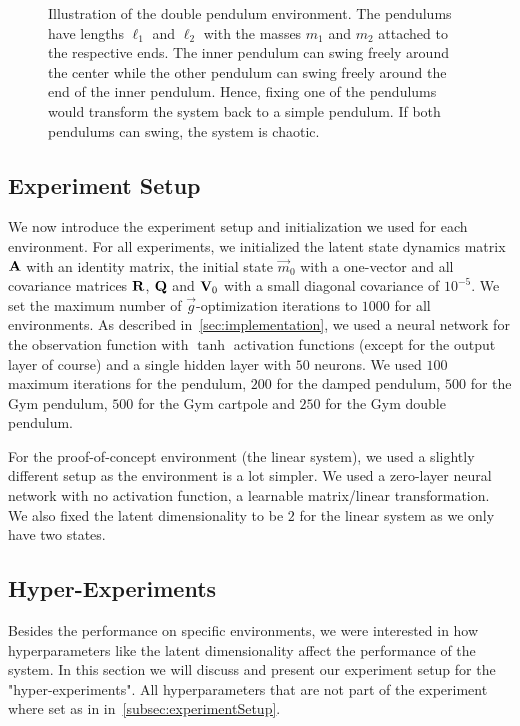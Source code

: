 			\begin{figure}
				\centering
				\tikzDoublePendulum
				\caption[Illustration of the double pendulum environment]{Illustration of the double pendulum environment. The pendulums have lengths \(\ell_1\) and \(\ell_2\) with the masses \(m_1\) and \(m_2\) attached to the respective ends. The inner pendulum can swing freely around the center while the other pendulum can swing freely around the end of the inner pendulum. Hence, fixing one of the pendulums would transform the system back to a simple pendulum. If both pendulums can swing, the system is chaotic.}
				\label{fig:envDoublePendulumGymSketch}
			\end{figure}

	\subsection{Experiment Setup}
		\label{subsec:experimentSetup}

		We now introduce the experiment setup and initialization we used for each environment. For all experiments, we initialized the latent state dynamics matrix \( \boldsymbol{\mathrm{A}} \) with an identity matrix, the initial state \( \vec{m}_0 \) with a one-vector and all covariance matrices \( \boldsymbol{\mathrm{R}} \), \( \boldsymbol{\mathrm{Q}} \) and \( \boldsymbol{\mathrm{V}}_0 \) with a small diagonal covariance of \( 10^{-5} \). We set the maximum number of \(\vec{g}\)-optimization iterations to \(1000\) for all environments. As described in~\autoref{sec:implementation}, we used a neural network for the observation function with \(\tanh\) activation functions (except for the output layer of course) and a single hidden layer with \(50\) neurons. We used \(100\) maximum iterations for the pendulum, \(200\) for the damped pendulum, \(500\) for the Gym pendulum, \(500\) for the Gym cartpole and \(250\) for the Gym double pendulum.

		For the proof-of-concept environment (the linear system), we used a slightly different setup as the environment is a lot simpler. We used a zero-layer neural network with no activation function, \ie a learnable matrix/linear transformation. We also fixed the latent dimensionality to be \(2\) for the linear system as we only have two states.

	\subsection{Hyper-Experiments}
		Besides the performance on specific environments, we were interested in how hyperparameters like the latent dimensionality affect the performance of the system. In this section we will discuss and present our experiment setup for the "hyper-experiments". All hyperparameters that are not part of the experiment where set as in in~\autoref{subsec:experimentSetup}.

